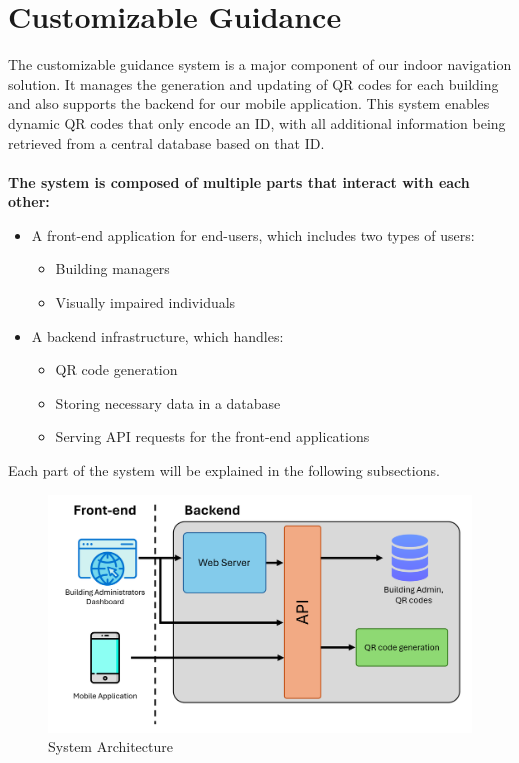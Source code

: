 \section{Customizable Guidance}

The customizable guidance system is a major component of our indoor navigation solution. It manages the generation and updating of QR codes for each building and also supports the backend for our mobile application. This system enables dynamic QR codes that only encode an ID, with all additional information being retrieved from a central database based on that ID. \\\\
\noindent
\textbf{The system is composed of multiple parts that interact with each other:}
 \begin{itemize} 
 	\item A front-end application for end-users, which includes two types of users: 
 	\begin{itemize} 
 		\item Building managers 
 		\item Visually impaired individuals 
 	\end{itemize} 
 	\item A backend infrastructure, which handles: \begin{itemize} 
 		\item QR code generation
 		 \item Storing necessary data in a database
 		  \item Serving API requests for the front-end applications
 	   \end{itemize}
     \end{itemize}

Each part of the system will be explained in the following subsections.

\begin{figure}[h] \centering \includegraphics[width=1\textwidth]{assets/ch3/building_management_dashboard_system_overview.png} 
	\caption{System Architecture} 
	\label{fig}
\end{figure}


